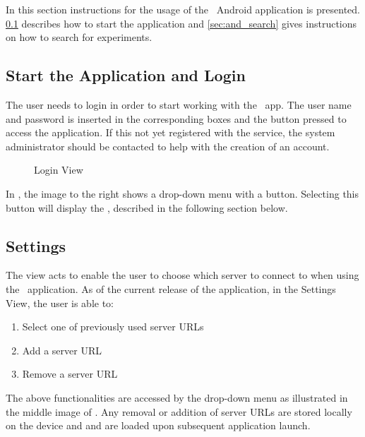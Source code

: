 In this section instructions for the usage of the \appName\ Android application is presented. \ref{sec:and_start} describes how to start the application and \ref{sec:and_search} gives instructions on how to search for experiments.

\subsection{Start the Application and Login}
\label{sec:and_start}


The user needs to login in order to start working with the \appName\ app. The  user name and password is inserted in the corresponding boxes and the  button pressed to access the application. If this not yet
registered with the service, the system administrator should be contacted to help with the creation of an account.

\begin{figure}[h]
\caption{Login View}
\label{fig:and_login_man}
\end{figure}
\FloatBarrier


In , the image to the right shows a drop-down menu with a  button. Selecting this button will display the , described in the following  section below.

\subsection{Settings}
The  view acts to enable the user to choose which server to connect to when using the \appName\ application. As of the current release of the application, in the Settings View, the user is able to:

\begin{enumerate}
\item Select one of previously used server URLs
\item Add a server URL
\item Remove a server URL
\end{enumerate}

The above functionalities are accessed by the drop-down menu as illustrated in the middle image  of  . Any removal or addition of server URLs are stored locally on the device and and are loaded upon subsequent application launch.


